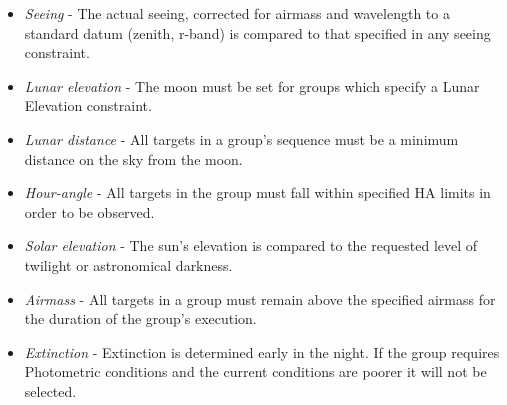\begin{itemize}
    \item \emph{Seeing} - The actual seeing, corrected for airmass and wavelength to a standard datum (zenith, r-band) is compared to that specified in any seeing constraint.
    \item \emph{Lunar elevation} - The moon must be set for groups which specify a Lunar Elevation constraint.
    \item \emph{Lunar distance} - All targets in a group's sequence must be a minimum distance on the sky from the moon.
    \item \emph{Hour-angle} - All targets in the group must fall within specified HA limits in order to be observed.
    \item \emph{Solar elevation} - The sun's elevation is compared to the requested level of twilight or astronomical darkness.
    \item \emph{Airmass} - All targets in a group must remain above the specified airmass for the duration of the group's execution.
    \item \emph{Extinction} - Extinction is determined early in the night. If the group requires Photometric conditions and the current conditions are poorer it will not be selected.



\end{itemize}
